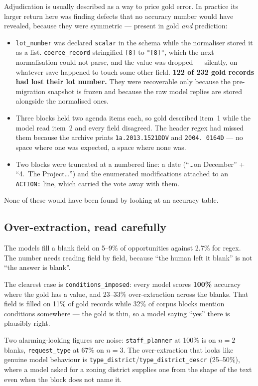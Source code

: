 \documentclass[11pt]{article}
\begin{document}
Adjudication is usually described as a way to price gold error. In practice its larger return
here was finding defects that no accuracy number would have revealed, because they were
symmetric --- present in gold \emph{and} prediction:

\begin{itemize}
\item \texttt{lot\_number} was declared \texttt{scalar} in the schema while the normaliser
stored it as a list. \texttt{coerce\_record} stringified \texttt{[8]} to \texttt{"[8]"}, which
the next normalisation could not parse, and the value was dropped --- silently, on whatever
save happened to touch some other field. \textbf{122 of 232 gold records had lost their lot
number.} They were recoverable only because the pre-migration snapshot is frozen and because
the raw model replies are stored alongside the normalised ones.
\item Three blocks held two agenda items each, so gold described item~1 while the model read
item~2 and every field disagreed. The header regex had missed them because the archive prints
\texttt{1a.2013.1521DDV} and \texttt{2004.\ 0164D} --- no space where one was expected,
a space where none was.
\item Two blocks were truncated at a numbered line: a date (``\ldots on December'' +
``4.~The Project\ldots'') and the enumerated modifications attached to an \texttt{ACTION:}
line, which carried the vote away with them.
\end{itemize}

None of these would have been found by looking at an accuracy table.

\subsection{Over-extraction, read carefully}

The models fill a blank field on 5--9\% of opportunities against 2.7\% for regex. The number
needs reading field by field, because ``the human left it blank'' is not ``the answer is
blank''.

The clearest case is \texttt{conditions\_imposed}: every model scores \textbf{100\%} accuracy
where the gold has a value, and 23--33\% over-extraction across the blanks. That field is
filled on 11\% of gold records while 32\% of corpus blocks mention conditions somewhere --- the
gold is thin, so a model saying ``yes'' there is plausibly right.

Two alarming-looking figures are noise: \texttt{staff\_planner} at 100\% is on $n=2$ blanks,
\texttt{request\_type} at 67\% on $n=3$. The over-extraction that looks like genuine model
behaviour is \texttt{type\_district}/\texttt{type\_district\_descr} (25--50\%), where a model
asked for a zoning district supplies one from the shape of the text even when the block does
not name it.
\end{document}
